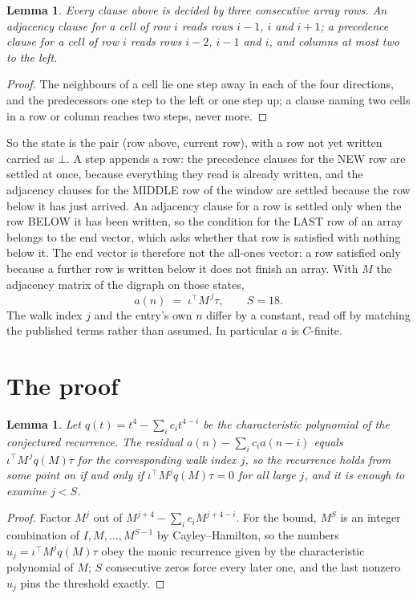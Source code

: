 \documentclass[11pt,a4paper]{article}
\theoremstyle{plain}
\newtheorem{lemma}[theorem]{Lemma}
\theoremstyle{definition}
\begin{document}
\begin{lemma}\label{lem:win}
Every clause above is decided by three consecutive array rows. An adjacency clause for a cell
of row $i$ reads rows $i-1$, $i$ and $i+1$; a precedence clause for a cell of row $i$ reads
rows $i-2$, $i-1$ and $i$, and columns at most two to the left.
\end{lemma}

\begin{proof}
The neighbours of a cell lie one step away in each of the four directions, and the predecessors
one step to the left or one step up; a clause naming two cells in a row or column reaches two
steps, never more.
\end{proof}

So the state is the pair (row above, current row), with a row not yet written carried as
$\bot$. A step appends a row: the precedence clauses for the NEW row are settled at once,
because everything they read is already written, and the adjacency clauses for the MIDDLE row
of the window are settled because the row below it has just arrived. An adjacency clause for a row is settled only when the row BELOW it has been
written, so the condition for the LAST row of an array belongs to the end vector, which asks
whether that row is satisfied with nothing below it. The end vector is therefore not the
all-ones vector: a row satisfied only because a further row is written below it does not
finish an array. With $M$ the
adjacency matrix of the digraph on those states,
\[
a(n)\;=\;\iota^{\!\top}M^{\,j}\tau ,\qquad S=18.
\]
The walk index $j$ and the entry's own $n$ differ by a constant, read off by matching the
published terms rather than assumed. In particular $a$ is $C$-finite.

\section{The proof}

\begin{lemma}\label{lem:crit}
Let $q(t)=t^{4}-\sum_i c_it^{4-i}$ be the characteristic polynomial of the
conjectured recurrence. The residual $a(n)-\sum_ic_ia(n-i)$ equals
$\iota^{\!\top}M^{\,j}q(M)\tau$ for the corresponding walk index $j$, so the recurrence
holds from some point on if and only if $\iota^{\!\top}M^{j}q(M)\tau=0$ for all large $j$,
and it is enough to examine $j<S$.
\end{lemma}

\begin{proof}
Factor $M^{j}$ out of $M^{j+4}-\sum_ic_iM^{j+4-i}$. For the bound, $M^{S}$
is an integer combination of $I,M,\dots,M^{S-1}$ by Cayley--Hamilton, so the numbers
$u_j=\iota^{\!\top}M^{j}q(M)\tau$ obey the monic recurrence given by the characteristic
polynomial of $M$; $S$ consecutive zeros force every later one, and the last nonzero $u_j$
pins the threshold exactly.
\end{proof}
\end{document}
